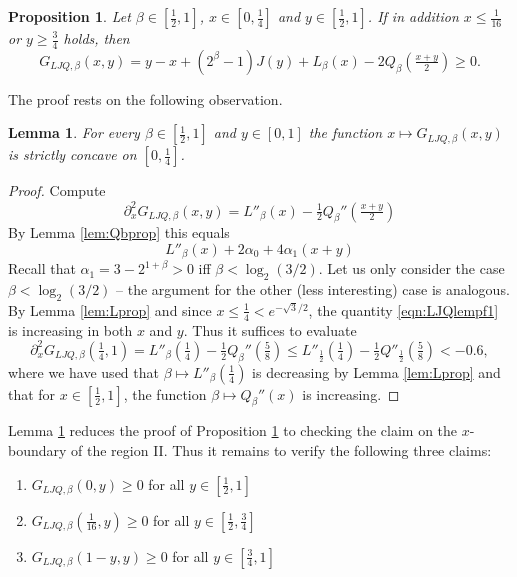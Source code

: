 \documentclass[12pt]{amsart}
\theoremstyle{plain}
\newtheorem{prop}[thm]{Proposition}
\newtheorem{lem}[thm]{Lemma}
\theoremstyle{definition}
\theoremstyle{remark}
\numberwithin{equation}{section}
\begin{document}
\begin{prop}\label{prop:caseLJQ} Let $\beta\in[\frac12,1]$,  $x\in [0,\frac14]$ and $y\in [\frac12,1]$.
If in addition $x\le \frac1{16}$ or $y\ge \frac34$ holds, then 
\[ \label{caseljq1} G_{LJQ,\beta}(x,y)=y-x + (2^\beta-1) J(y) +L_\beta(x)-2Q_\beta(\tfrac{x+y}{2})\geq 0.\] 
\end{prop}

The proof rests on the following observation.

\begin{lem}\label{lem:LJQconcave}
For every $\beta\in [\frac12,1]$ and $y\in [0, 1]$ the function $x\mapsto G_{LJQ,\beta}(x,y)$ is strictly concave on $[0,\frac14]$.
\end{lem}
\begin{proof}
Compute 
\[ \partial_x^2 G_{LJQ,\beta}(x,y) = L''_\beta(x) - \tfrac12 Q_\beta''(\tfrac{x+y}2) \]
By Lemma \ref{lem:Qbprop} this equals
\begin{equation}\label{eqn:LJQlempf1} L''_\beta(x) + 2\alpha_0 + 4\alpha_1 (x+y)
\end{equation}
Recall that $\alpha_1=3-2^{1+\beta}>0$ iff $\beta<\log_2(3/2)$. 
Let us only consider the case $\beta<\log_2(3/2)$ -- the argument for the other (less interesting) case is analogous.
By Lemma \ref{lem:Lprop} and since $x\le \frac14< e^{-\sqrt{3}/2}$, the quantity \eqref{eqn:LJQlempf1} is increasing in both $x$ and $y$. Thus it suffices to evaluate 
\[\partial_x^2 G_{LJQ,\beta}(\tfrac14,1)=L''_\beta(\tfrac14) - \tfrac12 Q_\beta''(\tfrac58)\le L''_{\frac12}(\tfrac14) -\tfrac12 Q''_{\frac12}(\tfrac58)<-0.6, \]
where we have used that $\beta\mapsto L''_\beta(\tfrac14)$ is decreasing by Lemma \ref{lem:Lprop} and that for $x\in[\tfrac12,1]$, the function $\beta\mapsto Q_\beta''(x)$ is increasing.
\end{proof}

Lemma \ref{lem:LJQconcave} reduces the proof of Proposition \ref{prop:caseLJQ} to checking the claim on the $x$-boundary of the region II. Thus it remains to verify the following three claims:
\begin{enumerate}
\item $G_{LJQ,\beta}(0,y)\ge 0$ for all $y\in [\frac12,1]$
\item $G_{LJQ,\beta}(\tfrac1{16},y)\ge 0$ for all $y\in[\tfrac12,\tfrac34]$
\item $G_{LJQ,\beta}(1-y,y)\ge 0$ for all $y\in [\tfrac34,1]$
\end{enumerate}
\end{document}
